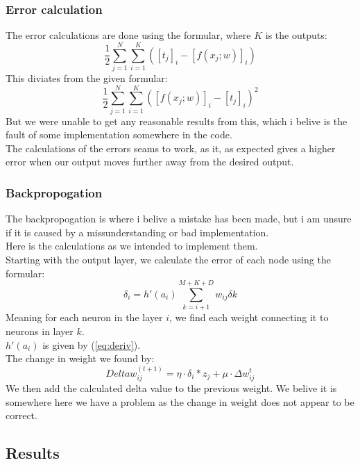 \documentclass{article}
\begin{document}
\subsubsection{Error calculation}
The error calculations are done using the formular, where $K$ is the outputs:
\begin{equation} \label{eq:badError}
    \frac{1}{2} \sum_{j = 1}^{N}\sum_{i = 1}^{K}([t_j]_i - [f(x_j;w)]_i)
\end{equation}
This diviates from the given formular:
\begin{equation}
    \frac{1}{2} \sum_{j = 1}^{N} \sum_{i = 1}^{K}([f(x_j;w)]_i - [t_j]_i)^2
\end{equation}
But we were unable to get any reasonable results from this, which i belive is the fault of some implementation somewhere in the code.\\
The calculations of the errors seams to work, as it, as expected gives a higher error when our output moves further away from the desired output.\\

\subsubsection{Backpropogation}
The backpropogation is where i belive a mistake has been made, but i am unsure if it is caused by a missunderstanding or bad implementation.\\
Here is the calculations as we intended to implement them.\\
Starting with the output layer, we calculate the error of each node using the formular:
\begin{equation}
    \delta_i = h'(a_i) \sum_{k = i + 1}^{M + K + D}w_{ij} \delta{k}
\end{equation}
Meaning for each neuron in the layer $i$, we find each weight connecting it to neurons in layer $k$.\\
$h'(a_i)$ is given by (\ref{eq:deriv}).\\
The change in weight we found by:
\begin{equation}
    Delta w_{ij}^{(t + 1)} = \eta \cdot \delta_i * z_j + \mu \cdot \Delta w_{ij}^{t}
\end{equation}
We then add the calculated delta value to the previous weight. 
We belive it is somewhere here we have a problem as the change in 
weight does not appear to be correct.

\subsection{Results}
\end{document}
